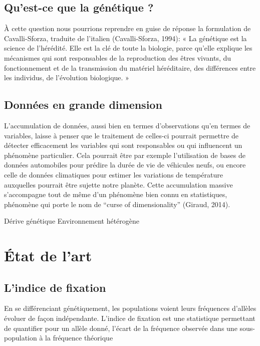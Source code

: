 \documentclass[12pt,twoside]{reedthesis}
\begin{document}
  \section{Qu'est-ce que la génétique ?}\label{quest-ce-que-la-genetique}
  
  À cette question nous pourrions reprendre en guise de réponse la
  formulation de Cavalli-Sforza, traduite de l'italien (Cavalli-Sforza,
  1994): « La génétique est la science de l'hérédité. Elle est la clé de
  toute la biologie, parce qu'elle explique les mécanismes qui sont
  responsables de la reproduction des êtres vivants, du fonctionnement et
  de la transmission du matériel héréditaire, des différences entre les
  individus, de l'évolution biologique. »
  
  \section{Données en grande dimension}\label{donnees-en-grande-dimension}
  
  L'accumulation de données, aussi bien en termes d'observations qu'en
  termes de variables, laisse à penser que le traitement de celles-ci
  pourrait permettre de détecter efficacement les variables qui sont
  responsables ou qui influencent un phénomène particulier. Cela pourrait
  être par exemple l'utilisation de bases de données automobiles pour
  prédire la durée de vie de véhicules neufs, ou encore celle de données
  climatiques pour estimer les variations de température auxquelles
  pourrait être sujette notre planète. Cette accumulation massive
  s'accompagne tout de même d'un phénomène bien connu en statistiques,
  phénomène qui porte le nom de ``curse of dimensionality'' (Giraud,
  2014).
  
  Dérive génétique Environnement hétérogène
  
  \chapter{État de l'art}\label{etat-de-lart}
  
  \section{L'indice de fixation}\label{lindice-de-fixation}
  
  En se différenciant génétiquement, les populations voient leurs
  fréquences d'allèles évoluer de façon indépendante. L'indice de fixation
  est une statistique permettant de quantifier pour un allèle donné,
  l'écart de la fréquence observée dans une sous-population à la fréquence
  théorique
  
\end{document}
